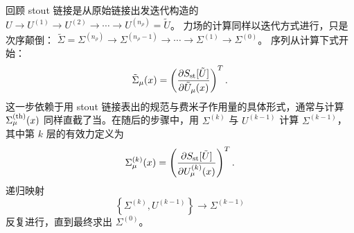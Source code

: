 回顾 stout 链接是从原始链接出发迭代构造的
$U\rightarrow U^{(1)}\rightarrow U^{(2)}
 \rightarrow\cdots\rightarrow U^{(n_\rho)}=\tilde{U}$。
力场的计算同样以迭代方式进行，只是次序颠倒：
$\tilde\Sigma=\Sigma^{(n_\rho)}\rightarrow\Sigma^{(n_\rho\!-\!1)}
\rightarrow\cdots\rightarrow\Sigma^{(1)}\rightarrow\Sigma^{(0)}$。
序列从计算下式开始：
\begin{equation}
 \tilde{\Sigma}_\mu(x)=\left(\frac{\partial S_{\rm st}[\tilde{U}]}{
  \partial \tilde{U}_\mu(x)}\right)^T.
\end{equation}
这一步依赖于用 stout 链接表出的规范与费米子作用量的具体形式，通常与计算
$\Sigma_\mu^{\rm(th)}(x)$ 同样直截了当。在随后的步骤中，用 $\Sigma^{(k)}$
与 $U^{(k\!-\!1)}$ 计算 $\Sigma^{(k-1)}$，其中第 $k$ 层的有效力定义为
\begin{equation}
  \Sigma_\mu^{(k)}(x)=\left(\frac{\partial S_{\rm st}[\tilde{U}]}{
  \partial U_\mu^{(k)}(x)}\right)^T.
\end{equation}
递归映射
\begin{equation}
   \left\{  \Sigma^{(k)}, U^{(k-1)}\right\}
  \longrightarrow \Sigma^{(k-1)}
\label{eq:mapping}
\end{equation}
反复进行，直到最终求出 $\Sigma^{(0)}$。

